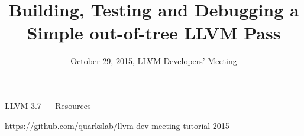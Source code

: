 \documentclass[14pt]{beamer}
\title{Building, Testing and Debugging a Simple out-of-tree LLVM Pass}
\date{October 29, 2015, LLVM Developers' Meeting}
\begin{document}
{
	\begin{frame}
        \maketitle
	\end{frame}
}


    \begin{frame}{LLVM 3.7 --- Resources}
        \begin{center}
            \url{https://github.com/quarkslab/llvm-dev-meeting-tutorial-2015}
        \end{center}
    \end{frame}

\end{document}
